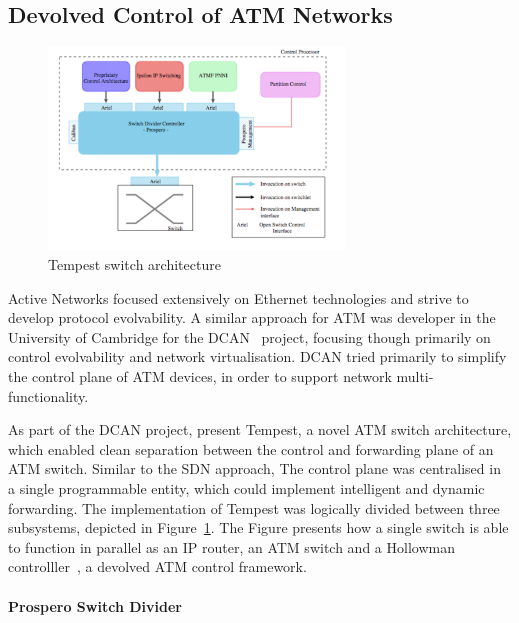 \subsection{Devolved Control of ATM Networks}

\begin{figure}
  \begin{center}
\includegraphics[width=0.7\textwidth]{Background/BackgroundFigs/tempest_arch}
\caption{Tempest switch architecture~\cite{UCAM-CL-TR-450}}
\label{fig:background:tempest_arch}
\end{center}
\end{figure}

Active Networks focused extensively on Ethernet technologies and strive to
develop protocol evolvability. A similar approach for ATM was developer in the
University of Cambridge for the DCAN~\cite{dcan} project, focusing though
primarily on control evolvability and network virtualisation. DCAN tried
primarily to simplify the control plane of ATM devices, in order to support
network multi-functionality. 

As part of the DCAN project, \cite{Rooney1998} present Tempest, a novel ATM
switch architecture, which enabled clean separation between the control and
forwarding plane of an ATM switch. Similar to the SDN approach,  The control
plane was centralised in a single programmable entity, which could implement
intelligent and dynamic forwarding.  The implementation of Tempest was logically
divided between three subsystems, depicted in
Figure~\ref{fig:background:tempest_arch}. The Figure presents how a single
switch is able to function in parallel as an IP router, an ATM switch and a
Hollowman controlller~\cite{Rooney1997}, a devolved ATM control framework. 

\paragraph{Prospero Switch Divider} 

